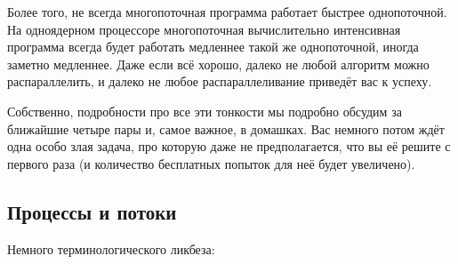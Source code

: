 \documentclass{../../text-style}
\begin{document}
Более того, не всегда многопоточная программа работает быстрее однопоточной. На одноядерном процессоре многопоточная вычислительно интенсивная программа всегда будет работать медленнее такой же однопоточной, иногда заметно медленнее. Даже если всё хорошо, далеко не любой алгоритм можно распараллелить, и далеко не любое распараллеливание приведёт вас к успеху. 

Собственно, подробности про все эти тонкости мы подробно обсудим за ближайшие четыре пары и, самое важное, в домашках. Вас немного потом ждёт одна особо злая задача, про которую даже не предполагается, что вы её решите с первого раза (и количество бесплатных попыток для неё будет увеличено).

\subsection{Процессы и потоки}

Немного терминологического ликбеза:
\end{document}
